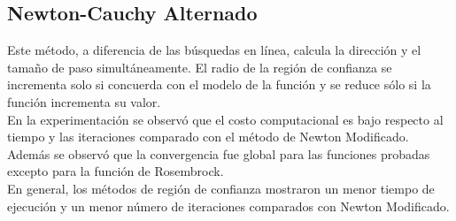 \documentclass[11pt,letterpaper]{article}
\theoremstyle{definition}
\theoremstyle{definition}
\theoremstyle{definition}
\begin{document}
	\subsection{Newton-Cauchy Alternado}
	Este método, a diferencia de las búsquedas en línea, calcula la dirección y el tamaño de paso simultáneamente. El radio de la región de confianza se incrementa solo si concuerda con el modelo de la función y se reduce sólo si la función incrementa su valor.
	\\
	En la experimentación se observó que el costo computacional es bajo respecto al tiempo y las iteraciones comparado con el método de Newton Modificado. Además se observó que la convergencia fue global para las funciones probadas excepto para la función de Rosembrock. 
	\\
	En general, los métodos de región de confianza mostraron un menor tiempo de ejecución y un menor número de iteraciones comparados con Newton Modificado.
\end{document}
